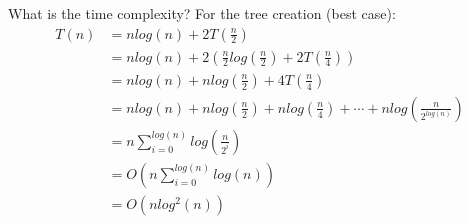 \documentclass[11 pt]{beamer}
\begin{document}
\begin{frame}{What is the time complexity?}
  For the tree creation (best case):
  \begin{align*}
    T(n) &= nlog(n)+2T\left(\frac{n}{2}\right)\\
         &= nlog(n)+2\left(\frac{n}{2}log\left(\frac{n}{2}\right)+2T\left(\frac{n}{4}\right)\right)\\
         &= nlog(n)+nlog\left(\frac{n}{2}\right)+4T\left(\frac{n}{4}\right)\\
         &= nlog(n)+nlog\left(\frac{n}{2}\right)+nlog\left(\frac{n}{4}\right)+\cdots+nlog\left(\frac{n}{2^{log(n)}}\right)\\
         &= n\sum^{log(n)}_{i=0}log\left(\frac{n}{2^i}\right)\\
         &= O\left(n\sum^{log(n)}_{i=0}log(n)\right)\\
         &= O(nlog^2(n))
  \end{align*}
\end{frame}
\end{document}
